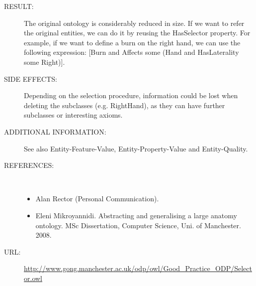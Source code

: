 \begin{description}
\item [RESULT:] The original ontology is considerably reduced in size. If we want to refer the original entities, we can do it by reusing the HasSelector property. For example, if we want to define a burn on the right hand, we can use the following expression: [Burn and Affects some (Hand and HasLaterality some Right)].

\item [SIDE EFFECTS:] Depending on the selection procedure, information could be lost when deleting the subclasses (e.g. RightHand), as they can have further subclasses or interesting axioms.

\item [ADDITIONAL INFORMATION:] See also Entity-Feature-Value, Entity-Property-Value and Entity-Quality.

\item [REFERENCES: ] ~\begin{itemize}
\item Alan Rector (Personal Communication).
\item Eleni Mikroyannidi. Abstracting and generalising a large anatomy ontology. MSc Dissertation, Computer Science, Uni. of Manchester. 2008.\end{itemize}
\item [URL: ] \url{http://www.gong.manchester.ac.uk/odp/owl/Good_Practice_ODP/Selector.owl} \end{description}
